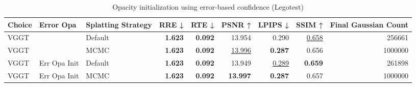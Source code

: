 \begin{table}[H]
\caption{Opacity initialization using error-based confidence (Legotest)}
\label{tab:05_error_opa_legotest}
\begin{tabular}{lllrrrrrr}
\toprule
Choice & Error Opa & Splatting Strategy & RRE ↓ & RTE ↓ & PSNR ↑ & LPIPS ↓ & SSIM ↑ & Final Gaussian Count \\
\midrule
VGGT &  & Default & \textbf{1.623} & \textbf{0.092} & 13.954 & 0.290 & \underline{0.658} & 256661 \\
VGGT &  & MCMC & \textbf{1.623} & \textbf{0.092} & \underline{13.996} & \textbf{0.287} & 0.656 & 1000000 \\
VGGT & Err Opa Init & Default & \textbf{1.623} & \textbf{0.092} & 13.949 & \underline{0.289} & \textbf{0.659} & 261898 \\
VGGT & Err Opa Init & MCMC & \textbf{1.623} & \textbf{0.092} & \textbf{13.997} & \textbf{0.287} & 0.657 & 1000000 \\
\bottomrule
\end{tabular}
\end{table}
